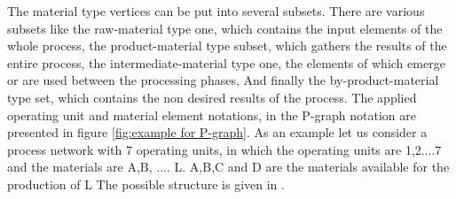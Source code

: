 The material type vertices can be put into several subsets. There are various subsets like the raw-material type one, which contains the input elements of the whole process, the product-material type subset, which gathers the results of the entire process, the intermediate-material type one, the elements of which emerge or are used between the processing phases\cite{pns2}, And finally the by-product-material type set, which contains the non desired results of the process. The applied operating unit and material element notations, in the P-graph notation are presented in figure \ref{fig:example for P-graph}. As an example let us consider a process network with 7 operating units, 
in which the operating units are 1,2....7 and the materials are A,B, .... L. A,B,C and D 
are the materials available for the production of L The possible structure is given in \cite{pns2, pns4}. 
 


